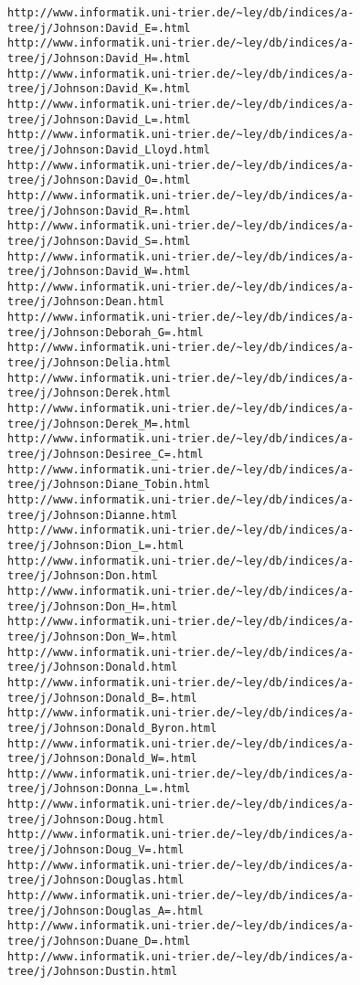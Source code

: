 \begin{verbatim}
http://www.informatik.uni-trier.de/~ley/db/indices/a-tree/j/Johnson:David_E=.html
http://www.informatik.uni-trier.de/~ley/db/indices/a-tree/j/Johnson:David_H=.html
http://www.informatik.uni-trier.de/~ley/db/indices/a-tree/j/Johnson:David_K=.html
http://www.informatik.uni-trier.de/~ley/db/indices/a-tree/j/Johnson:David_L=.html
http://www.informatik.uni-trier.de/~ley/db/indices/a-tree/j/Johnson:David_Lloyd.html
http://www.informatik.uni-trier.de/~ley/db/indices/a-tree/j/Johnson:David_O=.html
http://www.informatik.uni-trier.de/~ley/db/indices/a-tree/j/Johnson:David_R=.html
http://www.informatik.uni-trier.de/~ley/db/indices/a-tree/j/Johnson:David_S=.html
http://www.informatik.uni-trier.de/~ley/db/indices/a-tree/j/Johnson:David_W=.html
http://www.informatik.uni-trier.de/~ley/db/indices/a-tree/j/Johnson:Dean.html
http://www.informatik.uni-trier.de/~ley/db/indices/a-tree/j/Johnson:Deborah_G=.html
http://www.informatik.uni-trier.de/~ley/db/indices/a-tree/j/Johnson:Delia.html
http://www.informatik.uni-trier.de/~ley/db/indices/a-tree/j/Johnson:Derek.html
http://www.informatik.uni-trier.de/~ley/db/indices/a-tree/j/Johnson:Derek_M=.html
http://www.informatik.uni-trier.de/~ley/db/indices/a-tree/j/Johnson:Desiree_C=.html
http://www.informatik.uni-trier.de/~ley/db/indices/a-tree/j/Johnson:Diane_Tobin.html
http://www.informatik.uni-trier.de/~ley/db/indices/a-tree/j/Johnson:Dianne.html
http://www.informatik.uni-trier.de/~ley/db/indices/a-tree/j/Johnson:Dion_L=.html
http://www.informatik.uni-trier.de/~ley/db/indices/a-tree/j/Johnson:Don.html
http://www.informatik.uni-trier.de/~ley/db/indices/a-tree/j/Johnson:Don_H=.html
http://www.informatik.uni-trier.de/~ley/db/indices/a-tree/j/Johnson:Don_W=.html
http://www.informatik.uni-trier.de/~ley/db/indices/a-tree/j/Johnson:Donald.html
http://www.informatik.uni-trier.de/~ley/db/indices/a-tree/j/Johnson:Donald_B=.html
http://www.informatik.uni-trier.de/~ley/db/indices/a-tree/j/Johnson:Donald_Byron.html
http://www.informatik.uni-trier.de/~ley/db/indices/a-tree/j/Johnson:Donald_W=.html
http://www.informatik.uni-trier.de/~ley/db/indices/a-tree/j/Johnson:Donna_L=.html
http://www.informatik.uni-trier.de/~ley/db/indices/a-tree/j/Johnson:Doug.html
http://www.informatik.uni-trier.de/~ley/db/indices/a-tree/j/Johnson:Doug_V=.html
http://www.informatik.uni-trier.de/~ley/db/indices/a-tree/j/Johnson:Douglas.html
http://www.informatik.uni-trier.de/~ley/db/indices/a-tree/j/Johnson:Douglas_A=.html
http://www.informatik.uni-trier.de/~ley/db/indices/a-tree/j/Johnson:Duane_D=.html
http://www.informatik.uni-trier.de/~ley/db/indices/a-tree/j/Johnson:Dustin.html
\end{verbatim}